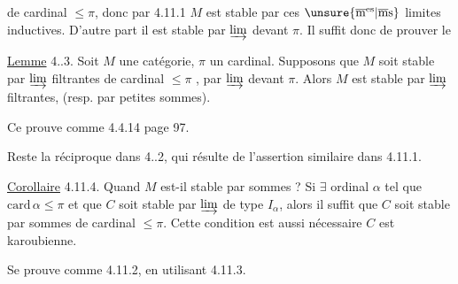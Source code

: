  de cardinal $\leq\pi$, donc par 4.11.1 $M$ est stable par ces $\unsure{\overline{\mathrm m}^{\mathrm{es}}|\overline{\mathrm m}\mathrm s}$  limites inductives.  D'autre part il est stable par $\varinjlim$  devant $\pi$. Il suffit donc de prouver le

\uline{Lemme} 4..3. Soit $M$ une catégorie, $\pi$ un cardinal. Supposons que $M$ soit stable par $\varinjlim$ filtrantes de cardinal $\leq\pi$ ,  par $\varinjlim$  devant $\pi$. Alors $M$ est stable par  $\varinjlim$ filtrantes, (resp. par   petites sommes).

Ce  prouve comme 4.4.14 page 97.

Reste la réciproque dans 4..2, qui résulte de l'assertion similaire dans 4.11.1.

\uline{Corollaire} 4.11.4. Quand $M$ est-il stable par sommes ? Si $\exists$ ordinal $\alpha$ tel que $\mathrm{card}\,\alpha\leq\pi$ et que $C$ soit stable par $\varinjlim$ de type $I_\alpha$, alors il suffit que $C$ soit stable par sommes de cardinal $\leq\pi$. Cette condition est aussi nécessaire  $C$ est karoubienne.

Se prouve comme 4.11.2, en utilisant 4.11.3.
